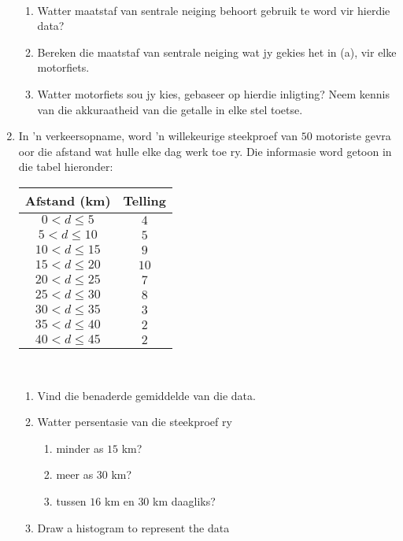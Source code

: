 \begin{eocexercises}{}
\begin{enumerate}[itemsep=6pt, label=\textbf{\arabic*}.]
\begin{center}
\begin{tabular}
      \end{tabular}
    \end{center}
\vspace {8pt}\\
\begin{enumerate}[noitemsep, label=\textbf{(\alph*)} ]
    \item Watter maatstaf van sentrale neiging behoort gebruik te word vir hierdie data?
    \item Bereken die maatstaf van sentrale neiging wat jy gekies het in (a), vir elke motorfiets.
    \item Watter motorfiets sou jy kies, gebaseer op hierdie inligting? Neem kennis van die akkuraatheid van die getalle in elke stel toetse. 
      
    \end{enumerate}

  \item In ’n verkeersopname, word ’n willekeurige steekproef van $50$ motoriste gevra oor die afstand wat hulle elke dag werk toe ry. Die informasie word getoon in die tabel hieronder: \\
    \begin{center}
      \begin{tabular}{|c|c|} \hline
     
        \textbf{Afstand (km)} & \textbf{Telling} \\ \hline

        $0 < d \leq 5$ & $4$ \\ \hline
        $5 < d \leq 10$ & $5$ \\\hline
        $10 < d \leq 15$ & $9$ \\\hline
        $15 < d \leq 20$ & $10$ \\\hline
        $20 < d \leq 25$ & $7$ \\\hline
        $25 < d \leq 30$ & $8$ \\\hline
        $30 < d \leq 35$ & $3$ \\\hline
        $35 < d \leq 40$ & $2$ \\\hline
        $40 < d \leq 45$ & $2$ \\\hline

      \end{tabular}
    \end{center}
\vspace {8pt}\\
     \begin{enumerate}[noitemsep, label=\textbf{(\alph*)} ]
    \item Vind die benaderde gemiddelde van die data.
    \item Watter persentasie van die steekproef ry 
      \begin{enumerate}[noitemsep, label=\textbf{\roman*}. ]
      \item minder as $15$ km?
      \item meer as $30$ km?
      \item tussen $16$ km en $30$ km daagliks?
      \end{enumerate}
\item Draw a histogram to represent the data
    \end{enumerate}


\end{enumerate}
\end{eocexercises}
